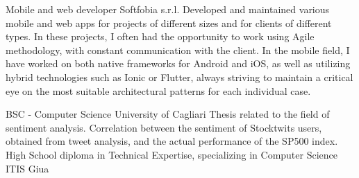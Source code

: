 \documentclass[
	a4paper,
]{fortysecondscv}
\begin{document}
\makefrontsidebar

\begin{cvtable}[2.3]
        {Mobile and web developer}
        {Softfobia s.r.l.}
        {Developed and maintained various mobile and web apps for projects of different sizes and for clients of different types. In these projects, I often had the opportunity to work using Agile methodology, with constant communication with the client. In the mobile field, I have worked on both native frameworks for Android and iOS, as well as utilizing hybrid technologies such as Ionic or Flutter, always striving to maintain a critical eye on the most suitable architectural patterns for each individual case.}
\end{cvtable}


\begin{cvtable}[3]
        {BSC - Computer Science}
        {University of Cagliari}
        {Thesis related to the field of sentiment analysis. Correlation between the sentiment of Stocktwits users, obtained from tweet analysis, and the actual performance of the SP500 index.}
        {High School diploma in Technical Expertise, specializing in Computer Science}
        {ITIS Giua}
        {\\}
\end{cvtable}
\end{document}
